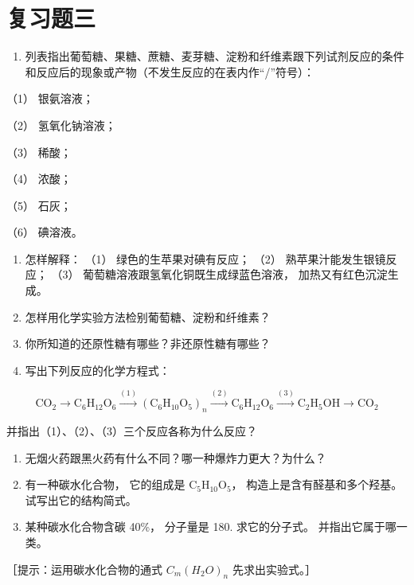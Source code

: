 \section{复习题三}

\begin{enumerate}
\item
  列表指出葡萄糖、果糖、蔗糖、麦芽糖、淀粉和纤维素跟下列试剂反应的条件和反应后的现象或产物（不发生反应的在表内作``/''符号）：
\end{enumerate}

（1） 银氨溶液；

（2） 氢氧化钠溶液；

（3） 稀酸；

（4） 浓酸；

（5） 石灰；

（6） 碘溶液。

\begin{enumerate}[start=2]
\item
  怎样解释： （1） 绿色的生苹果对碘有反应； （2）
  熟苹果汁能发生银镜反应； （3） 葡萄糖溶液跟氢氧化铜既生成绿蓝色溶液，
  加热又有红色沉淀生成。
\item
  怎样用化学实验方法检别葡萄糖、淀粉和纤维素？
\item
  你所知道的还原性糖有哪些？非还原性糖有哪些？
\item
  写出下列反应的化学方程式：
\end{enumerate}

\[
\mathrm{CO} _ {2} \longrightarrow \mathrm{C} _ {6} \mathrm{H} _ {12} \mathrm{O} _ {6} \xrightarrow {(1)} (\mathrm{C} _ {6} \mathrm{H} _ {10} \mathrm{O} _ {5}) _ {n} \xrightarrow {(2)} \mathrm{C} _ {6} \mathrm{H} _ {12} \mathrm{O} _ {6} \xrightarrow {(3)} \mathrm{C} _ {2} \mathrm{H} _ {5} \mathrm{OH} \longrightarrow \mathrm{CO} _ {2}
\]

并指出（1）、（2）、（3）三个反应各称为什么反应？

\begin{enumerate}[start=6]
\item
  无烟火药跟黑火药有什么不同？哪一种爆炸力更大？为什么？
\item
  有一种碳水化合物， 它的组成是
  \(\mathrm{C}_{5} \mathrm{H}_{10} \mathrm{O}_{5}\)，
  构造上是含有醛基和多个羟基。试写出它的结构简式。
\item
  某种碳水化合物含碳 40\%， 分子量是 180. 求它的分子式。
  并指出它属于哪一类。
\end{enumerate}

［提示：运用碳水化合物的通式 \(C_{m}(H_{2}O)_{n}\) 先求出实验式。］

